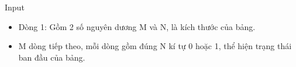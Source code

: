 Input  
\begin{itemize}
	\item     Dòng 1: Gồm 2 số nguyên dương M và N, là kích thước của bảng.   
	\item     M dòng tiếp theo, mỗi dòng gồm đúng N kí tự 0 hoặc 1, thể hiện trạng thái ban đầu của bảng.   
\end{itemize}